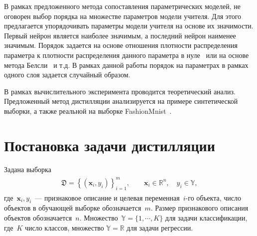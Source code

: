 \documentclass[12pt]{a&t}
\begin{document}
В рамках предложенного метода сопоставления параметрических моделей, не оговорен выбор порядка на множестве параметров модели учителя. Для этого предлагается упорядочивать параметры модели учителя на основе их значимости. Первый нейрон является наиболее значимым, а последний нейрон наименее значимым. Порядок задается на основе отношения плотности распределения параметра к плотности распределения данного параметра в нуле~\cite{graves2011} или на основе метода Белсли~\cite{grabovoy2019} и т.д. В рамках данной работы порядок на параметрах в рамках одного слоя задается случайный образом.

В рамках вычислительного эксперимента проводится теоретический анализ. Предложенный метод дистилляции анализируется на примере синтетической выборки, а также реальной на выборке FashionMnist~\cite{fashionmnist}.

\section{Постановка задачи дистилляции}
Задана выборка
\begin{gather}
\label{eq:st:1}
\begin{aligned}
\mathfrak{D} = \left\{\left(\mathbf{x}_i, y_i\right)\right\}_{i=1}^{m}, \qquad \mathbf{x}_i \in \mathbb{R}^{n}, \quad y_i \in \mathbb{Y},
\end{aligned}
\end{gather}
где~$\mathbf{x}_i, y_i$~--- признаковое описание и целевая переменная~$i$-го объекта, число объектов в обучающей выборке обозначается~$m$. Размер признакового описания объектов обозначается~$n$. Множество~$\mathbb{Y}=\{1,\cdots,K\}$ для задачи классификации, где~$K$ число классов, множество $\mathbb{Y}=\mathbb{R}$ для задачи регрессии.
\end{document}
